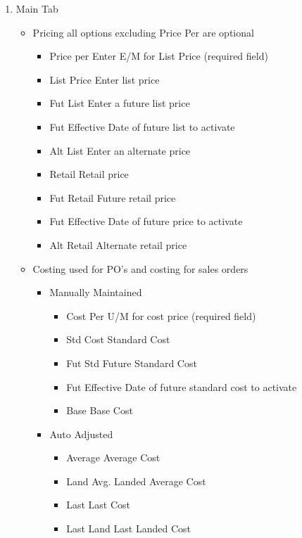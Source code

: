 \begin{enumerate}
	\item Main Tab
	\begin{itemize}
		\item Pricing \textemdash all options excluding Price Per are optional
		\begin{itemize}
			\item Price per \textemdash Enter E/M for List Price (required field)
			\item List Price \textemdash Enter list price
			\item Fut List \textemdash Enter a future list price
			\item Fut Effective \textemdash Date of future list to activate
			\item Alt List \textemdash Enter an alternate price
			\item Retail \textemdash Retail price
			\item Fut Retail \textemdash Future retail price
			\item Fut Effective \textemdash Date of future price to activate
			\item Alt Retail \textemdash Alternate retail price
		\end{itemize}
		\item Costing \textemdash used for PO's and costing for sales orders
		\begin{itemize}
			\item Manually Maintained
			\begin{itemize}
				\item Cost Per \textemdash U/M for cost price (required field)
				\item Std Cost \textemdash Standard Cost
				\item Fut Std \textemdash Future Standard Cost
				\item Fut Effective \textemdash Date of future standard cost to activate
				\item Base \textemdash Base Cost				
			\end{itemize}
			\item Auto Adjusted
			\begin{itemize}
				\item Average \textemdash Average Cost
				\item Land Avg. \textemdash Landed Average Cost
				\item Last \textemdash Last Cost
				\item Last Land \textemdash Last Landed Cost
			\end{itemize}
		\end{itemize}

\end{itemize}
\end{enumerate}
